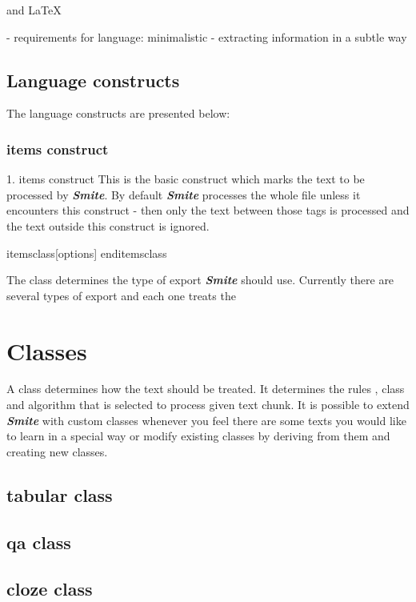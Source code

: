 \documentclass[a4paper,11pt]{article}
\newcommand{\smite}{\emph{\textbf{Smite{}}}}
\begin{document}
and LaTeX

- requirements for language: minimalistic - extracting information in a subtle
way



\subsection{Language constructs}
The language constructs are presented below:


\subsubsection{items construct}

1.  items construct This is the basic construct which marks the text to
be processed by \smite{}. By default \smite{} processes the whole file unless it
encounters this construct - then only the text between those tags is processed
and the text outside this construct is ignored.

 items{class}[options]
 enditems{class}

The {class} determines the type of export \smite{} should use. Currently
there are several types of export and each one treats the





\section{Classes}

A class determines how the text should be treated. It determines the rules ,
class and algorithm that is selected to process given text chunk.  It is
possible to extend \smite{} with custom classes whenever you feel there are
some texts you would like to learn in a special way or modify existing classes
by deriving from them and creating new classes.

\subsection{tabular class}


\subsection{qa class}


\subsection{cloze class}
\end{document}
